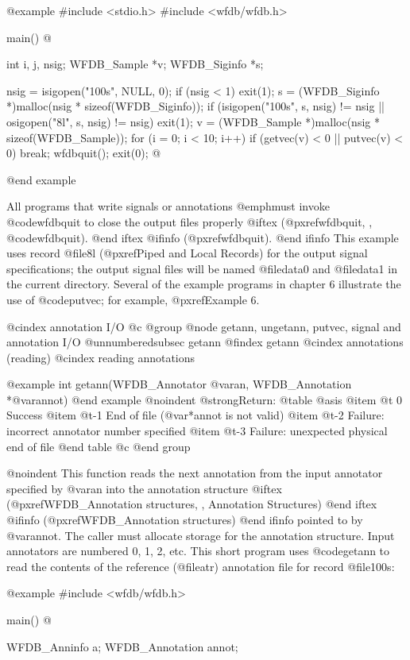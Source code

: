 {{{{{{{{{@example
#include <stdio.h>
#include <wfdb/wfdb.h>

main()
@{
    int i, j, nsig;
    WFDB_Sample *v;
    WFDB_Siginfo *s;

    nsig = isigopen("100s", NULL, 0);
    if (nsig < 1)
        exit(1);
    s = (WFDB_Siginfo *)malloc(nsig * sizeof(WFDB_Siginfo));
    if (isigopen("100s", s, nsig) != nsig || 
        osigopen("8l", s, nsig) != nsig)
        exit(1);
    v = (WFDB_Sample *)malloc(nsig * sizeof(WFDB_Sample));
    for (i = 0; i < 10; i++)
        if (getvec(v) < 0 || putvec(v) < 0)
            break;
    wfdbquit();
    exit(0);
@}
@end example

All programs that write signals or annotations @emph{must} invoke
@code{wfdbquit} to close the output files properly
@iftex
(@pxref{wfdbquit, , @code{wfdbquit}}).
@end iftex
@ifinfo
(@pxref{wfdbquit}).
@end ifinfo
This example uses record @file{8l} (@pxref{Piped and Local Records}) for the
output signal specifications; the output signal files will be named
@file{data0} and @file{data1} in the current directory.  Several of the example
programs in chapter 6 illustrate the use of @code{putvec}; for example,
@pxref{Example 6}.

@cindex annotation I/O
@c @group
@node     getann, ungetann, putvec, signal and annotation I/O
@unnumberedsubsec getann
@findex getann
@cindex annotations (reading)
@cindex reading annotations

@example
int getann(WFDB_Annotator @var{an}, WFDB_Annotation *@var{annot})
@end example
@noindent
@strong{Return:}
@table @asis
@item @t{ 0}
Success
@item @t{-1}
End of file (@var{*annot} is not valid)
@item @t{-2}
Failure: incorrect annotator number specified
@item @t{-3}
Failure: unexpected physical end of file
@end table
@c @end group

@noindent
This function reads the next annotation from the input annotator
specified by @var{an} into the annotation structure
@iftex
(@pxref{WFDB_Annotation structures, , Annotation Structures})
@end iftex
@ifinfo
(@pxref{WFDB_Annotation structures})
@end ifinfo
pointed to by @var{annot}.  The caller must allocate storage for the
annotation structure.  Input annotators are numbered 0, 1, 2, etc.  This
short program uses @code{getann} to read the contents of the reference
(@file{atr}) annotation file for record @file{100s}:

@example
#include <wfdb/wfdb.h>

main()
@{
    WFDB_Anninfo a;
    WFDB_Annotation annot;

}}}}}}}}}}
